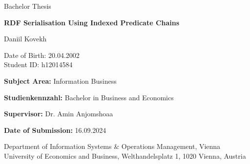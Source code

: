 \fancyfoot[C]{\thepage}

\renewcommand{\headrulewidth}{0pt}
\renewcommand{\footrulewidth}{0pt}

\pagestyle{fancy}

\usepackage{hyperref}




\AddToShipoutPicture*{\BackgroundPic} %
\thispagestyle{empty}                %

\vspace*{2cm} %

\noindent\large Bachelor Thesis
\vspace{1cm}

\noindent\huge\textbf{RDF Serialisation Using Indexed Predicate Chains}
\bigskip

\noindent\LARGE Daniil Kovekh
\bigskip

\noindent\small Date of Birth: 20.04.2002 \\
\noindent\small Student ID: h12014584
\bigskip

\vspace{2cm}

\noindent\large \textbf{Subject Area:} Information Business
\bigskip

\noindent\large \textbf{Studienkennzahl:} Bachelor in Business and Economics
\bigskip

\noindent\large \textbf{Supervisor:} Dr. Amin Anjomshoaa
\bigskip

\noindent\large \textbf{Date of Submission:} 16.09.2024
\bigskip\bigskip\bigskip\bigskip\bigskip\bigskip

\noindent Department of Information Systems \& Operations Management, Vienna University of Economics and Business, Welthandelsplatz 1, 1020 Vienna, Austria

